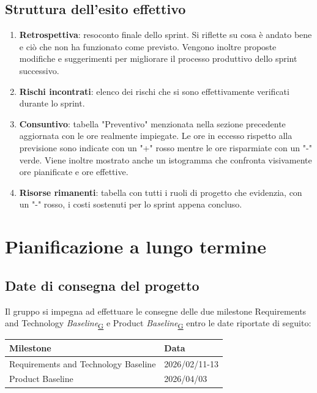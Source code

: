 \documentclass[a4paper,12pt]{article}
\begin{document}
{    \subsection{Struttura dell'esito effettivo}{
        \begin{enumerate}
            \item \textbf{Retrospettiva}: resoconto finale dello sprint. Si riflette su cosa è andato bene e ciò che non ha funzionato come previsto. Vengono inoltre proposte modifiche e suggerimenti
                per migliorare il processo produttivo dello sprint successivo.
            \item \textbf{Rischi incontrati}: elenco dei rischi che si sono effettivamente verificati durante lo sprint.    
            \item \textbf{Consuntivo}: tabella "Preventivo" menzionata nella sezione precedente aggiornata con le ore realmente impiegate. Le ore in eccesso rispetto alla previsione
                sono indicate con un "+" rosso mentre le ore risparmiate con un "-" verde. Viene inoltre mostrato anche un istogramma che confronta visivamente ore pianificate e ore effettive.
            \item \textbf{Risorse rimanenti}: tabella con tutti i ruoli di progetto che evidenzia, con un "-" rosso, i costi sostenuti per lo sprint appena concluso.
        \end{enumerate}  
    }
}

\newpage


\section{Pianificazione a lungo termine}
    \subsection{Date di consegna del progetto}{
        Il gruppo si impegna ad effettuare le consegne delle due milestone Requirements and Technology \textit{Baseline}\textsubscript{\href{https://atlasteam9.github.io/Atlas/glossario.html\#Baseline}{G}} e Product \textit{Baseline}\textsubscript{\href{https://atlasteam9.github.io/Atlas/glossario.html\#Baseline}{G}} entro le date riportate di seguito:
        \begin{center}
            \begin{tabular}{|p{10cm}|p{4cm}|}
                \hline
                \textbf{Milestone} & \textbf{Data} \\
                \hline
                Requirements and Technology Baseline & 2026/02/11-13 \\
                \hline
                Product Baseline & 2026/04/03 \\
                \hline
            \end{tabular}
        \end{center}

    }
\end{document}
